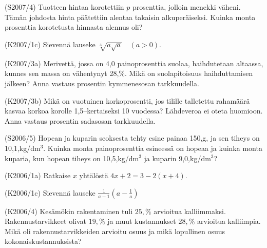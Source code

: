 \begin{tehtava}(S2007/4)   Tuotteen hintaa korotettiin $p$ prosenttia, jolloin menekki väheni.
                        Tämän johdosta hinta päätettiin alentaa takaisin alkuperäiseksi.
                        Kuinka monta prosenttia korotetusta hinnasta alennus oli?
\end{tehtava}

\begin{tehtava}(K2007/1c)  Sievennä lauseke $ \sqrt[3]{a \sqrt{a}} \quad (a > 0) $.
\end{tehtava}

\begin{tehtava}(K2007/3a)  Merivettä, jossa on 4,0 painoprosenttia suolaa, haihdutetaan
                        altaassa, kunnes sen massa on vähentynyt 28,\%. Mikä on
                        suolapitoisuus haihduttamisen jälkeen? Anna vastaus prosentin
                        kymmenesosan tarkkuudella. 
\end{tehtava}

\begin{tehtava}(K2007/3b)  Mikä on vuotuinen korkoprosentti, jos tilille talletettu rahamäärä
                        kasvaa korkoa korolle 1,5--kertaiseksi 10 vuodessa? Lähdeveroa
                        ei oteta huomioon. Anna vastaus prosentin sadasosan 
                        tarkkuudella.
\end{tehtava}

\begin{tehtava}(S2006/5)   Hopean ja kuparin seoksesta tehty esine painaa 150,g, ja sen
                       tiheys on 10,1,kg/dm\(^3\). Kuinka monta painoprosenttia 
                        esineessä on hopeaa ja kuinka monta kuparia, kun hopean tiheys on 
                        10,5,kg/dm\(^3\) ja kuparin 9,0,kg/dm\(^3\)?
\end{tehtava}

\begin{tehtava}(K2006/1a)  Ratkaise $x$ yhtälöstä $4x + 2 =  3 - 2(x + 4)$.
\end{tehtava}

\begin{tehtava}(K2006/1c)  Sievennä lauseke 
                        $ \frac{1}{a - 1} \left( a - \frac{1}{a} \right) $
\end{tehtava}

\begin{tehtava}(K2006/4)   Kesämökin rakentaminen tuli $25,\%$ arvioitua kalliimmaksi.
 Rakennustarvikkeet olivat $19,\%$ ja muut kustannukset $28,\% $
                        arvioitua kalliimpia. Mikä oli rakennustarvikkeiden arvioitu osuus ja 
                        mikä lopullinen osuus kokonaiskustannuksista?
\end{tehtava}

